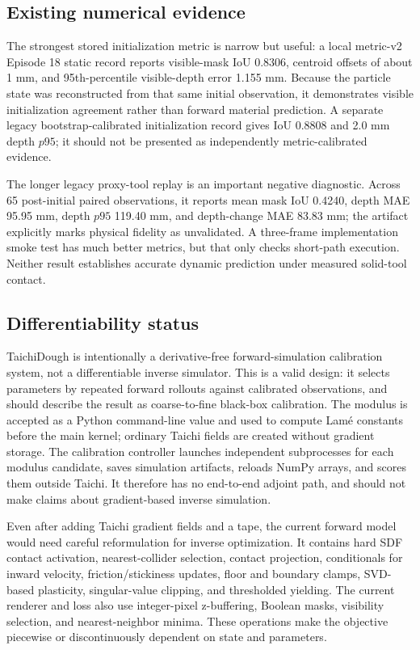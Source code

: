 \documentclass[11pt]{article}
\begin{document}
\subsection*{Existing numerical evidence}

The strongest stored initialization metric is narrow but useful: a local metric-v2 Episode 18 static record reports visible-mask IoU 0.8306, centroid offsets of about 1 mm, and 95th-percentile visible-depth error 1.155 mm. Because the particle state was reconstructed from that same initial observation, it demonstrates visible initialization agreement rather than forward material prediction. A separate legacy bootstrap-calibrated initialization record gives IoU 0.8808 and 2.0 mm depth $p95$; it should not be presented as independently metric-calibrated evidence.

The longer legacy proxy-tool replay is an important negative diagnostic. Across 65 post-initial paired observations, it reports mean mask IoU 0.4240, depth MAE 95.95 mm, depth $p95$ 119.40 mm, and depth-change MAE 83.83 mm; the artifact explicitly marks physical fidelity as unvalidated. A three-frame implementation smoke test has much better metrics, but that only checks short-path execution. Neither result establishes accurate dynamic prediction under measured solid-tool contact.

\subsection*{Differentiability status}

TaichiDough is intentionally a derivative-free forward-simulation calibration system, not a differentiable inverse simulator. This is a valid design: it selects parameters by repeated forward rollouts against calibrated observations, and should describe the result as coarse-to-fine black-box calibration. The modulus is accepted as a Python command-line value and used to compute Lam\'e constants before the main kernel; ordinary Taichi fields are created without gradient storage. The calibration controller launches independent subprocesses for each modulus candidate, saves simulation artifacts, reloads NumPy arrays, and scores them outside Taichi. It therefore has no end-to-end adjoint path, and should not make claims about gradient-based inverse simulation.

Even after adding Taichi gradient fields and a tape, the current forward model would need careful reformulation for inverse optimization. It contains hard SDF contact activation, nearest-collider selection, contact projection, conditionals for inward velocity, friction/stickiness updates, floor and boundary clamps, SVD-based plasticity, singular-value clipping, and thresholded yielding. The current renderer and loss also use integer-pixel z-buffering, Boolean masks, visibility selection, and nearest-neighbor minima. These operations make the objective piecewise or discontinuously dependent on state and parameters.
\end{document}
